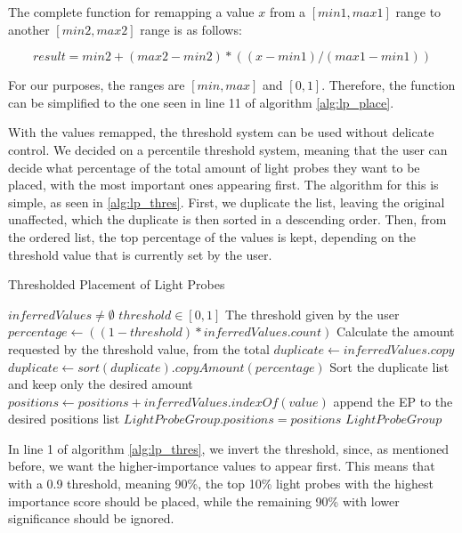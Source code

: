 The complete function for remapping a value $x$ from a \([min1, max1]\) range to another \([min2, max2]\) range is as follows:

\[ result = min2 + (max2 - min2) * ((x - min1)/(max1 - min1)) \]

For our purposes, the ranges are \([min, max]\) and \([0, 1]\). Therefore, the function can be simplified to the one seen in line 11 of algorithm \ref{alg:lp_place}.\newline

With the values remapped, the threshold system can be used without delicate control. We decided on a percentile threshold system, meaning that the user can decide what percentage of the total amount of light probes they want to be placed, with the most important ones appearing first. The algorithm for this is simple, as seen in \ref{alg:lp_thres}. First, we duplicate the list, leaving the original unaffected, which the duplicate is then sorted in a descending order. Then, from the ordered list, the top percentage of the values is kept, depending on the threshold value that is currently set by the user.

\begin{algorithm}
	\caption{Thresholded Placement of Light Probes}
	\label{alg:lp_thres}
	\begin{algorithmic}[1]
		\Require $inferredValues \neq \emptyset$
		\Require $threshold \in [0, 1]$
		\Comment The threshold given by the user
		\State $percentage \gets ((1-threshold) * inferredValues.count)$
		\Comment Calculate the amount requested by the threshold value, from the total
		\label{alg:lp_thres:1}
		\State $duplicate \gets inferredValues.copy$
		\State $duplicate \gets sort(duplicate).copyAmount(percentage)$
		\Comment Sort the duplicate list and keep only the desired amount
			\State $positions \gets positions + inferredValues.indexOf(value)$
			\Comment append the EP to the desired positions list
		\EndFor
		\State $LightProbeGroup.positions = positions$
		\State \Return $Light Probe Group$
	\end{algorithmic}
\end{algorithm}

In line 1 of algorithm \ref{alg:lp_thres}, we invert the threshold, since, as mentioned before, we want the higher-importance values to appear first. This means that with a 0.9 threshold, meaning 90\%, the top 10\% light probes with the highest importance score should be placed, while the remaining 90\% with lower significance should be ignored.\newline 

